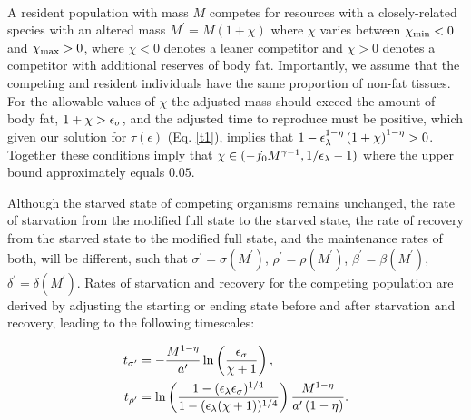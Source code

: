 \documentclass[twocolumn,preprintnumbers,amsmath,amssymb,superscriptaddress]{revtex4}
\begin{document}
{\\
A resident population with mass $M$ competes for resources with a closely-related species with an altered mass $M^\prime = M(1+\chi)$ where $\chi$ varies between $\chi_{\rm \rm min} <0$ and $\chi_{\rm \rm max}>0$, where $\chi<0$ denotes a leaner competitor and $\chi > 0$ denotes a competitor with additional reserves of body fat.
Importantly, we assume that the competing and resident individuals have the same proportion of non-fat tissues.
For the allowable values of $\chi$ the adjusted mass should exceed the amount of body fat, $1+\chi>\epsilon_{\rm \sigma}$, and the adjusted time to reproduce must be positive, which given our solution for $\tau(\epsilon)$ (Eq. \ref{t1}), implies that $1-\epsilon_{\rm \lambda}^{1-\eta}\left(1+\chi\right)^{1-\eta}>0$.
Together these conditions imply that  $\chi\in(-f_0M^{\gamma-1},1/\epsilon_{\rm \lambda}-1)$ where the upper bound approximately equals $0.05$.

Although the starved state of competing organisms remains unchanged, the rate of starvation from the modified full state to the starved state, the rate of recovery from the starved state to the modified full state, and the maintenance rates of both, will be different, such that $\sigma^\prime = \sigma(M^\prime)$, $\rho^\prime = \rho(M^\prime)$, $\beta^\prime = \beta(M^\prime)$, $\delta^\prime = \delta(M^\prime)$.
Rates of starvation and recovery for the competing population are derived by adjusting the starting or ending state before and after starvation and recovery, leading to the following timescales:

\begin{align}
t_{\rm \sigma^\prime} &= -\frac{M^{1-\eta}}{a^{\prime}}\ln \left(\frac{\epsilon_\sigma}{\chi +1}\right), \\ \nonumber
t_{\rm \rho^\prime} &= \ln \left(\frac{1-(\epsilon_\lambda \epsilon_\sigma)^{1/4}}{1-( \epsilon_\lambda(\chi +1))^{1/4}}\right)\frac{M^{1-\eta}}{a^{\prime}\left(1-\eta\right)}.
\end{align}


}
\end{document}
